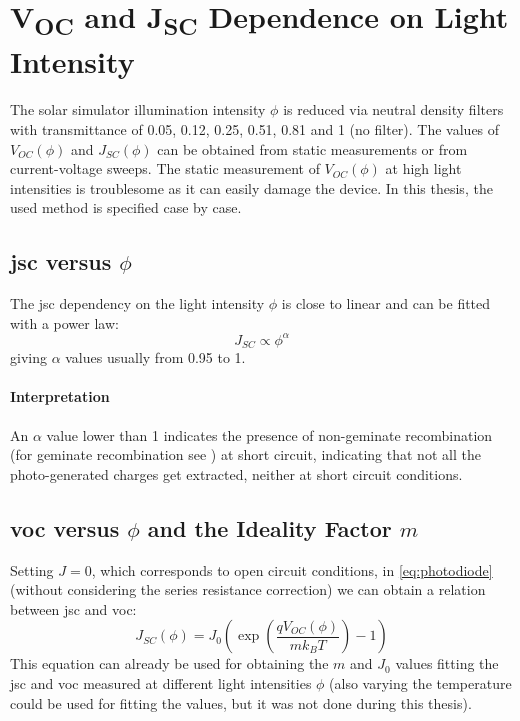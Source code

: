 \section{V\textsubscript{OC} and J\textsubscript{SC} Dependence on Light Intensity}
The solar simulator illumination intensity $\phi$ is reduced via neutral density filters with transmittance of 0.05, 0.12, 0.25, 0.51, 0.81 and 1 (no filter). The values of $V_{OC}(\phi)$ and $J_{SC}(\phi)$ can be obtained from static measurements or from current-voltage sweeps. The static measurement of $V_{OC}(\phi)$ at high light intensities is troublesome as it can easily damage the device. In this thesis, the used method is specified case by case. %

\subsection{\Gls{jsc} versus $\phi$}
The \gls{jsc} dependency on the light intensity $\phi$ is close to linear and can be fitted with a power law:
\begin{equation} \label{eq:jsc-phi}
J_{SC} \propto \phi^\alpha
\end{equation}
giving $\alpha$ values usually from 0.95 to 1.

\paragraph{Interpretation} %
An $\alpha$ value lower than 1 indicates the presence of non-geminate recombination (for geminate recombination see ) at short circuit\cite{Credgington2011}, indicating that not all the photo-generated charges get extracted, neither at short circuit conditions.

\subsection{\Gls{voc} versus $\phi$ and the Ideality Factor $m$}

Setting $J=0$, which corresponds to open circuit conditions, in \cref{eq:photodiode} (without considering the series resistance correction) we can obtain a relation between \gls{jsc} and \gls{voc}:
$$J_{SC}(\phi) = J_0\left(\exp\left(\frac{qV_{OC}(\phi)}{mk_BT}\right)-1\right)$$
This equation can already be used for obtaining the $m$ and $J_0$ values fitting the \gls{jsc} and \gls{voc} measured at different light intensities $\phi$ (also varying the temperature could be used for fitting the values, but it was not done during this thesis).

